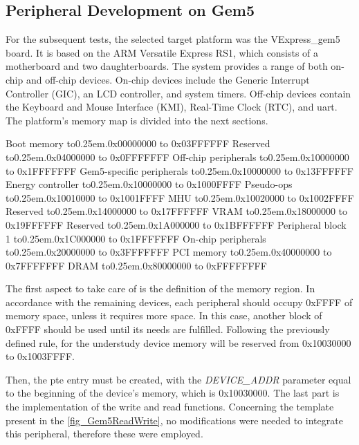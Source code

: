 \subsection{Peripheral Development on Gem5}

For the subsequent tests, the selected target platform was the VExpress\_gem5 board. It is based on the ARM Versatile Express RS1, which 
consists of a motherboard and two daughterboards. The system provides a range of both on-chip and off-chip devices.
On-chip devices include the Generic Interrupt Controller (GIC), an LCD controller, and system timers.
Off-chip devices contain the Keyboard and Mouse Interface (KMI), Real-Time Clock (RTC), and \gls{uart}. 
The platform's memory map is divided into the next sections.

\def\mydots{\xleaders\hbox to0.25em{\hfill.\hfill}\hfill}

\begin{outline}[enumerate]
	\1 Boot memory 						\mydots 	0x00000000 to 0x03FFFFFF
	\1 Reserved							\mydots 	0x04000000 to 0x0FFFFFFF
	\1 Off-chip peripherals				\mydots 	0x10000000 to 0x1FFFFFFF
		\2 Gem5-specific peripherals	\mydots 	0x10000000 to 0x13FFFFFF
			\3 Energy controller 		\mydots 	0x10000000 to 0x1000FFFF
			\3 Pseudo-ops				\mydots		0x10010000 to 0x1001FFFF
			\3 MHU						\mydots		0x10020000 to 0x1002FFFF
		\2 Reserved 					\mydots 	0x14000000 to 0x17FFFFFF
		\2 VRAM							\mydots		0x18000000 to 0x19FFFFFF
		\2 Reserved 					\mydots		0x1A000000 to 0x1BFFFFFF
		\2 Peripheral block 1			\mydots		0x1C000000 to 0x1FFFFFFF
	\1 On-chip  peripherals				\mydots 	0x20000000 to 0x3FFFFFFF
	\1 PCI memory 						\mydots 	0x40000000 to 0x7FFFFFFF
	\1 DRAM								\mydots 	0x80000000 to 0xFFFFFFFF
\end{outline}

The first aspect to take care of is the definition of the memory region. In accordance with the remaining devices, each peripheral should 
occupy 0xFFFF of memory space, unless it requires more space. In this case, another block of 0xFFFF should be used until its needs are fulfilled. 
Following the previously defined rule, for the understudy device memory will be reserved from 0x10030000 to 0x1003FFFF.

Then, the \gls{pte} entry must be created, with the \textit{DEVICE\_ADDR} parameter equal to the beginning of the device's memory, which 
is 0x10030000. The last part is the implementation of the write and read functions. Concerning the 
template present in the \autoref{fig_Gem5ReadWrite}, no modifications were needed to integrate this peripheral, therefore these were employed. 

